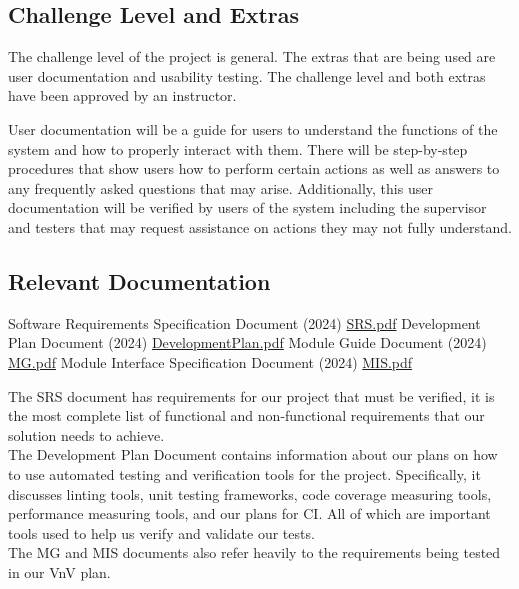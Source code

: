 \documentclass[12pt, titlepage]{article}
\begin{document}
\subsection{Challenge Level and Extras}

The challenge level of the project is general. The extras that are being used
are user documentation and usability testing. The challenge level and both extras
have been approved by an instructor.

User documentation will be a guide for users to understand the functions
of the system and how to properly interact with them. There will be step-by-step
procedures that show users how to perform certain actions as well as answers to any
frequently asked questions that may arise. Additionally, this user documentation
will be verified by users of the system including the supervisor and testers that
may request assistance on actions they may not fully understand.

\subsection{Relevant Documentation}

\begin{thebibliography}{9}
   Software Requirements Specification Document (2024)
  \href{../SRS-Volere/SRS.pdf}{SRS.pdf}
   Development Plan Document (2024)
  \href{../DevelopmentPlan/DevelopmentPlan.pdf}{DevelopmentPlan.pdf}
   Module Guide Document (2024)
  \href{../Design/SoftArchitecture/MG.pdf}{MG.pdf}
   Module Interface Specification Document (2024)
  \href{../Design/SoftDetailedDes/MIS.pdf}{MIS.pdf}
  \\
\end{thebibliography}

The SRS document has requirements for our project that must be verified, it is
the most complete list of functional and non-functional requirements that our
solution needs to achieve.\\

The Development Plan Document contains information about our plans on how to use 
automated testing and verification tools for the project. Specifically, it discusses
linting tools, unit testing frameworks, code coverage measuring tools, performance
measuring tools, and our plans for CI. All of which are important tools used to 
help us verify and validate our tests.\\

The MG and MIS documents also refer heavily to the requirements being tested
in our VnV plan.
\end{document}
